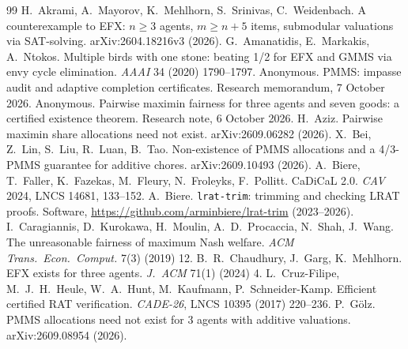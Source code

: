 \documentclass[11pt,a4paper]{article}
\theoremstyle{remark}
\begin{document}
\begin{thebibliography}{99}\small
{} H.~Akrami, A.~Mayorov, K.~Mehlhorn, S.~Srinivas, C.~Weidenbach. A counterexample to EFX: $n\ge3$ agents, $m\ge n+5$ items, submodular valuations via SAT-solving. arXiv:2604.18216v3 (2026).
 G.~Amanatidis, E.~Markakis, A.~Ntokos. Multiple birds with one stone: beating 1/2 for EFX and GMMS via envy cycle elimination. \emph{AAAI} 34 (2020) 1790--1797.
 Anonymous. PMMS: impasse audit and adaptive completion certificates. Research memorandum, 7 October 2026.
 Anonymous. Pairwise maximin fairness for three agents and seven goods: a certified existence theorem. Research note, 6 October 2026.
 H.~Aziz. Pairwise maximin share allocations need not exist. arXiv:2609.06282 (2026).
 X.~Bei, Z.~Lin, S.~Liu, R.~Luan, B.~Tao. Non-existence of PMMS allocations and a 4/3-PMMS guarantee for additive chores. arXiv:2609.10493 (2026).
 A.~Biere, T.~Faller, K.~Fazekas, M.~Fleury, N.~Froleyks, F.~Pollitt. CaDiCaL 2.0. \emph{CAV} 2024, LNCS 14681, 133--152.
 A.~Biere. \texttt{lrat-trim}: trimming and checking LRAT proofs. Software, \url{https://github.com/arminbiere/lrat-trim} (2023--2026).
 I.~Caragiannis, D.~Kurokawa, H.~Moulin, A.~D.~Procaccia, N.~Shah, J.~Wang. The unreasonable fairness of maximum Nash welfare. \emph{ACM Trans.\ Econ.\ Comput.} 7(3) (2019) 12.
 B.~R.~Chaudhury, J.~Garg, K.~Mehlhorn. EFX exists for three agents. \emph{J.\ ACM} 71(1) (2024) 4.
 L.~Cruz-Filipe, M.~J.~H.~Heule, W.~A.~Hunt, M.~Kaufmann, P.~Schneider-Kamp. Efficient certified RAT verification. \emph{CADE-26}, LNCS 10395 (2017) 220--236.
 P.~G\"olz. PMMS allocations need not exist for 3 agents with additive valuations. arXiv:2609.08954 (2026).
\end{thebibliography}
\end{document}
